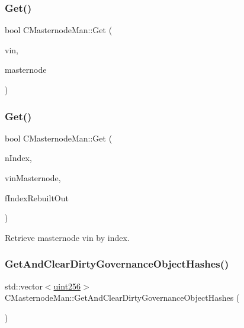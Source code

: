 \subsubsection{\texorpdfstring{Get()}{Get()}\hspace{0.1cm}{\footnotesize\ttfamily [2/3]}}
{\footnotesize\ttfamily bool C\+Masternode\+Man\+::\+Get (\begin{DoxyParamCaption}\item[{const C\+Tx\+In \&}]{vin,  }\item[{\mbox{\hyperlink{class_c_masternode}{C\+Masternode}} \&}]{masternode }\end{DoxyParamCaption})}

\mbox{\label{class_c_masternode_man_a492f859f9d5ab1bde26cb258781f8f96}} 
\subsubsection{\texorpdfstring{Get()}{Get()}\hspace{0.1cm}{\footnotesize\ttfamily [3/3]}}
{\footnotesize\ttfamily bool C\+Masternode\+Man\+::\+Get (\begin{DoxyParamCaption}\item[{int}]{n\+Index,  }\item[{C\+Tx\+In \&}]{vin\+Masternode,  }\item[{bool \&}]{f\+Index\+Rebuilt\+Out }\end{DoxyParamCaption})\hspace{0.3cm}{\ttfamily [inline]}}



Retrieve masternode vin by index. 

\mbox{\label{class_c_masternode_man_aac50d92c2e58d658df889ff3079c75fe}} 
\subsubsection{\texorpdfstring{Get\+And\+Clear\+Dirty\+Governance\+Object\+Hashes()}{GetAndClearDirtyGovernanceObjectHashes()}}
{\footnotesize\ttfamily std\+::vector$<$\mbox{\hyperlink{classuint256}{uint256}}$>$ C\+Masternode\+Man\+::\+Get\+And\+Clear\+Dirty\+Governance\+Object\+Hashes (\begin{DoxyParamCaption}{ }\end{DoxyParamCaption})\hspace{0.3cm}{\ttfamily [inline]}}

